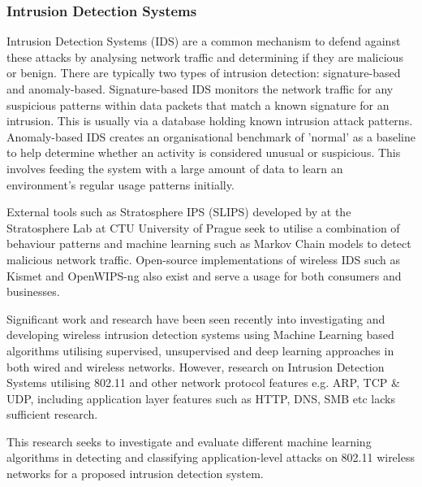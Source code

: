 
\subsubsection{Intrusion Detection Systems}

\smallskip

Intrusion Detection Systems (IDS) are a common mechanism to defend against these attacks by analysing network traffic and determining if they are malicious or benign. There are typically two types of intrusion detection: signature-based and anomaly-based. Signature-based IDS monitors the network traffic for any suspicious patterns within data packets that match a known signature for an intrusion. This is usually via a database holding known intrusion attack patterns. Anomaly-based IDS creates an organisational benchmark of 'normal' as a baseline to help determine whether an activity is considered unusual or suspicious. This involves feeding the system with a large amount of data to learn an environment's regular usage patterns initially. 

External tools such as Stratosphere IPS (SLIPS) developed by \cite{garcia_2015_slips} at the Stratosphere Lab at CTU University of Prague seek to utilise a combination of behaviour patterns and machine learning such as Markov Chain models to detect malicious network traffic. Open-source implementations of wireless IDS such as Kismet \parencite{kismet_2002_kismet} and OpenWIPS-ng \parencite{thomasdotreppe_2011_openwipsng} also exist and serve a usage for both consumers and businesses.

\medskip
Significant work and research have been seen recently into investigating and developing wireless intrusion detection systems using Machine Learning based algorithms utilising supervised, unsupervised and deep learning approaches in both wired and wireless networks. However, research on Intrusion Detection Systems utilising 802.11 and other network protocol features e.g. ARP, TCP \& UDP, including application layer features such as HTTP, DNS, SMB etc lacks sufficient research.

This research seeks to investigate and evaluate different machine learning algorithms in detecting and classifying application-level attacks on 802.11 wireless networks for a proposed intrusion detection system. 

